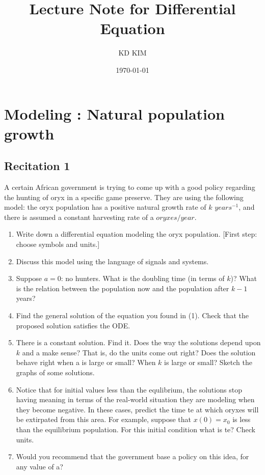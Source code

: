 \documentclass[8pt, a4paper]{article}
\title{Lecture Note for Differential Equation}
\author{KD KIM}
\date{\today}
\begin{document}
\maketitle

\section{Modeling : Natural population growth}
\subsection{Recitation 1}
A certain African government is trying to come up with a good policy regarding
the hunting of oryx in a specific game preserve.
They are using the following model:
the oryx population has a positive natural growth rate of $k$ $years^{-1}$, 
and there is assumed a constant harvesting rate of a $oryxes/year$.
\newline
\begin{enumerate}
\item Write down a differential equation modeling the oryx population. [First
  step: choose symbols and units.]
\item Discuss this model using the language of signals and systems.
 
\item Suppose $a = 0$: no hunters. What is the doubling time (in terms of $k$)?
What is the relation between the population now and the population after $k-1$
years?

\item Find the general solution of the equation you found in (1).
  Check that the proposed solution satisfies the ODE.
\item  There is a constant solution. Find it.
  Does the way the solutions depend upon $k$ and a make sense?
  That is, do the units come out right?
  Does the solution behave right when a is large or small? When $k$ is large or small?
  Sketch the graphs of some solutions.
\item Notice that for initial values less than the equlibrium,
  the solutions stop having meaning in terms of the real-world situation they are modeling
  when they become negative.
  In these cases, predict the time te at which oryxes will be extirpated from this area.
  For example, suppose that $x(0) = x_0$ is less than the equilibrium population.
  For this initial condition what is te? Check units.
\item Would you recommend that the government base a policy on this idea, for any value of a?

\end{enumerate}
\end{document}
